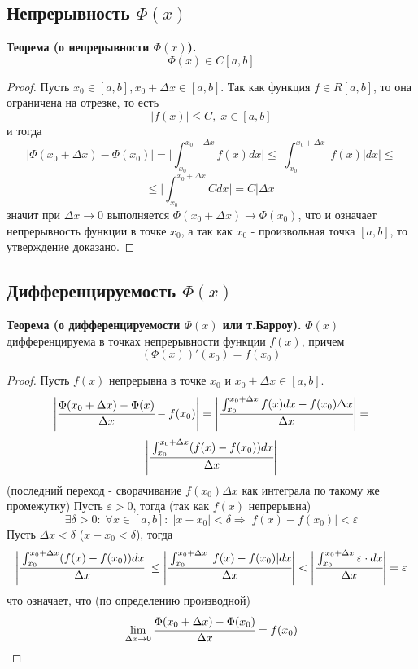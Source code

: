 \documentclass{article}
\newcommand*{\limToZero}[2]{\displaystyle \lim_{#1 \to 0} #2}
\newcommand*{\theorem}[2]{\textbf{Теорема #1. } #2 \newline}
\newcommand*{\eps}{\varepsilon}
\newcommand*{\cf}[2]{\cfrac{#1}{#2}}
\newcommand*{\D}{\Delta}
\begin{document}
\subsection{Непрерывность $\Phi(x)$}
\theorem{(о непрерывности $\Phi(x)$)}{}
$$
    \Phi(x) \in C[a, b]
$$
\begin{proof}
    Пусть $x_0 \in [a, b], x_0 + \Delta x \in [a, b]$. Так как функция $f \in R[a, b]$, то она ограничена на отрезке, то есть 
    $$
        |f(x)| \leq C, \; x \in [a, b]
    $$
    и тогда 
    $$
        |\Phi(x_0 + \Delta x) - \Phi(x_0)| = \Biggl| \int_{x_0}^{x_0 + \Delta x} f(x)dx \Biggr| \leq \Biggl| \int_{x_0}^{x_0 + \Delta x} |f(x)|dx \Biggr| \leq 
    $$
    $$
        \leq \Biggl| \int_{x_0}^{x_0 + \Delta x} Cdx \Biggr| = C |\Delta x|
    $$
    значит при $\Delta x \to 0$ выполняется $\Phi(x_0 + \Delta x) \to \Phi(x_0)$, что и означает непрерывность функции в точке $x_0$, а так как $x_0$ - произвольная точка $[a, b]$, то утверждение доказано.
\end{proof}
\subsection{Дифференцируемость $\Phi(x)$}
\theorem{(о дифференцируемости $\Phi(x)$ или т.Барроу)}{$\Phi(x)$ дифференцируема в точках непрерывности функции $f(x)$, причем}
$$
    (\Phi(x))'(x_0) = f(x_0)
$$
\begin{proof}
    Пусть $f(x)$ непрерывна в точке $x_0$ и $x_0 + \Delta x \in [a, b]$.
    $$
        \Biggl| \cfrac{\Phi(x_0 + \Delta x) - \Phi(x)}{\Delta x} - f(x_0) \Biggr| = \Biggl| \cf{\int_{x_0}^{x_0 + \D x} f(x)dx - f(x_0)\D x}{\D x} \Biggr| =
    $$
    $$
        \Biggl| \cf{\int_{x_0}^{x_0 + \D x} (f(x) - f(x_0))dx}{\D x} \Biggr|
    $$
    (последний переход - сворачивание $f(x_0)\D x$ как интеграла по такому же промежутку)
    \newline 
    Пусть $\eps > 0$, тогда (так как $f(x)$ непрерывна)
    $$
        \exists \delta > 0: \; \forall x \in [a, b]: \; |x - x_0| < \delta \Rightarrow |f(x) - f(x_0)| < \eps
    $$
    Пусть $\D x < \delta$ ($x - x_0 < \delta$), тогда 
    $$
        \Biggl| \cf{\int_{x_0}^{x_0 + \D x} (f(x) - f(x_0))dx}{\D x} \Biggr| \leq \Biggl| \cf{\int_{x_0}^{x_0 + \D x} |f(x) - f(x_0)|dx}{\D x} \Biggr| < \Biggl| \cf{\int_{x_0}^{x_0 + \D x} \eps \cdot dx}{\D x} \Biggr| = \eps
    $$
    что означает, что (по определению производной)
    $$
        \displaystyle \limToZero{\D x}{\cf{\Phi(x_0 + \D x) - \Phi(x_0)}{\D x}} = f(x_0)
    $$
\end{proof}
\end{document}
